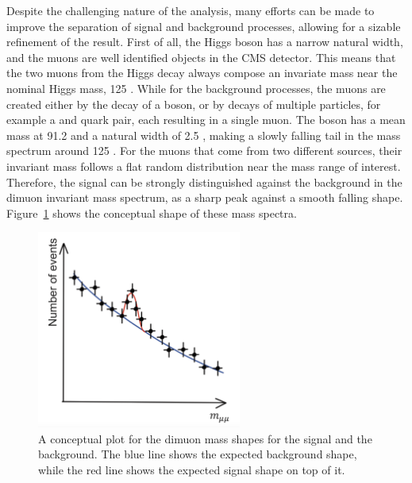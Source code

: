 Despite the challenging nature of the \hmm analysis, many efforts can be made to improve the separation of signal and background processes, 
allowing for a sizable refinement of the result.
First of all, the Higgs boson has a narrow natural width, and the muons are well identified objects in the CMS detector.
This means that the two muons from the Higgs decay always compose an invariate mass near the nominal Higgs mass, 125 \GeV.
While for the background processes, the muons are created either by the decay of a \PZ boson, 
or by decays of multiple particles, for example a \Pqt and \Paqt quark pair, each resulting in a single muon.
The \PZ boson has a mean mass at 91.2 \GeV and a natural width of 2.5 \GeV, making a slowly falling tail in the mass spectrum around 125 \GeV.
For the muons that come from two different sources, their invariant mass follows a flat random distribution near the mass range of interest.
Therefore, the signal can be strongly distinguished against the background in the dimuon invariant mass spectrum, 
as a sharp peak against a smooth falling shape. Figure~\ref{fig:dimuon_mass_shapes} shows the conceptual shape of these mass spectra. 

\begin{figure}[!htb]
    \centering
    \captionsetup{justification=justified}
    \includegraphics[width=0.6\textwidth]{pics/hmm_mass_sketch.png}
    \caption{A conceptual plot for the dimuon mass shapes for the signal and the background. 
             The blue line shows the expected background shape, while the red line shows the expected signal shape on top of it.}
    \label{fig:dimuon_mass_shapes}
\end{figure}

